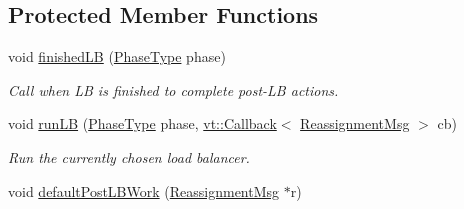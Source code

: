 \subsection*{Protected Member Functions}
\begin{DoxyCompactItemize}
\item 
void \hyperlink{structvt_1_1vrt_1_1collection_1_1balance_1_1_l_b_manager_a7b5455f6e85bb16453971e49ab6450fa}{finished\+LB} (\hyperlink{namespacevt_a46ce6733d5cdbd735d561b7b4029f6d7}{Phase\+Type} phase)
\begin{DoxyCompactList}\small\item\em Call when LB is finished to complete post-\/\+LB actions. \end{DoxyCompactList}\item 
void \hyperlink{structvt_1_1vrt_1_1collection_1_1balance_1_1_l_b_manager_a1c94e2b100562775d0663d10f5b557d9}{run\+LB} (\hyperlink{namespacevt_a46ce6733d5cdbd735d561b7b4029f6d7}{Phase\+Type} phase, \hyperlink{namespacevt_a57b238783d05de96bc2c4027f7073b7f}{vt\+::\+Callback}$<$ \hyperlink{structvt_1_1vrt_1_1collection_1_1balance_1_1_reassignment_msg}{Reassignment\+Msg} $>$ cb)
\begin{DoxyCompactList}\small\item\em Run the currently chosen load balancer. \end{DoxyCompactList}\item 
void \hyperlink{structvt_1_1vrt_1_1collection_1_1balance_1_1_l_b_manager_a702179841dc5bb5f730bf81a74092ae2}{default\+Post\+L\+B\+Work} (\hyperlink{structvt_1_1vrt_1_1collection_1_1balance_1_1_reassignment_msg}{Reassignment\+Msg} $\ast$r)
\end{DoxyCompactItemize}
